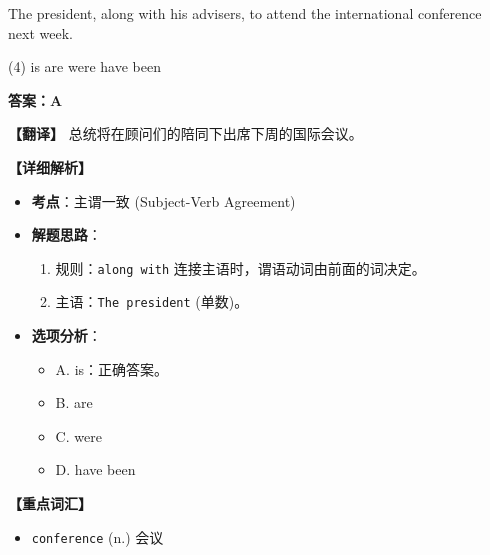 \documentclass[11pt, a4paper]{article}
\newcommand{\analysis}[4]{
    \begin{solutionbox}
        \textbf{答案：#1}
        
        \textbf{【翻译】} #2
        
        \textbf{【详细解析】}
        #3
        
        \textbf{【重点词汇】}
        #4
    \end{solutionbox}
}
\newcommand{\blank}{\underline{\hspace{1.5cm}}}
\begin{document}
\begin{questions}
    \item The president, along with his advisers, \blank to attend the international conference next week.
    \begin{tasks}(4)
        \task is \task are \task were \task have been
    \end{tasks}
    \analysis{A}{总统将在顾问们的陪同下出席下周的国际会议。}{
        \begin{itemize}
            \item \textbf{考点}：主谓一致 (Subject-Verb Agreement)
            \item \textbf{解题思路}：
                \begin{enumerate}
                    \item 规则：\texttt{along with} 连接主语时，谓语动词由前面的词决定。
                    \item 主语：\texttt{The president} (单数)。
                \end{enumerate}
            \item \textbf{选项分析}：
                \begin{itemize}
                    \item A. is：正确答案。
                    \item B. are
                    \item C. were
                    \item D. have been
                \end{itemize}
        \end{itemize}
    }{
        \begin{itemize}
            \item \texttt{conference} (n.) 会议
        \end{itemize}
    }


\end{questions}
\end{document}
